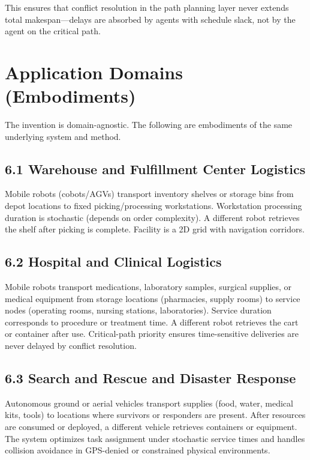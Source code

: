 \documentclass[12pt]{article}
\begin{document}
This ensures that conflict resolution in the path planning layer never extends total makespan---delays are absorbed by agents with schedule slack, not by the agent on the critical path.

\section{Application Domains (Embodiments)}

The invention is domain-agnostic. The following are embodiments of the same underlying system and method.

\subsection{6.1 \quad Warehouse and Fulfillment Center Logistics}
Mobile robots (cobots/AGVs) transport inventory shelves or storage bins from depot locations to fixed picking/processing workstations. Workstation processing duration is stochastic (depends on order complexity). A different robot retrieves the shelf after picking is complete. Facility is a 2D grid with navigation corridors.

\subsection{6.2 \quad Hospital and Clinical Logistics}
Mobile robots transport medications, laboratory samples, surgical supplies, or medical equipment from storage locations (pharmacies, supply rooms) to service nodes (operating rooms, nursing stations, laboratories). Service duration corresponds to procedure or treatment time. A different robot retrieves the cart or container after use. Critical-path priority ensures time-sensitive deliveries are never delayed by conflict resolution.

\subsection{6.3 \quad Search and Rescue and Disaster Response}
Autonomous ground or aerial vehicles transport supplies (food, water, medical kits, tools) to locations where survivors or responders are present. After resources are consumed or deployed, a different vehicle retrieves containers or equipment. The system optimizes task assignment under stochastic service times and handles collision avoidance in GPS-denied or constrained physical environments.
\end{document}
